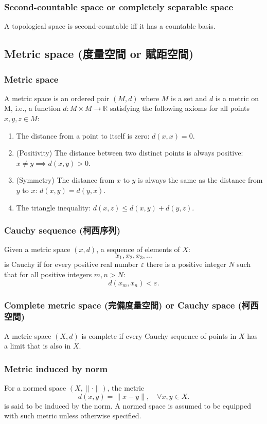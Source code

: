 \documentclass[a4paper,12pt]{article}
\begin{document}
\subsubsection{Second-countable space or completely separable space}
A topological space is second-countable iff it has a countable basis.
\subsection{Metric space (度量空間 or 賦距空間)}
\subsubsection{Metric space}
A metric space is an ordered pair $(M, d)$ where $M$ is a set and $d$ is a metric on M, i.e., a function $d\colon M\times M\to\mathbb{R}$ satisfying the following axioms for all points $x,y,z\in M$:
\begin{enumerate}
\item The distance from a point to itself is zero: $d(x,x)=0$.
\item (Positivity) The distance between two distinct points is always positive:$x\neq y\implies d(x,y)>0$.
\item (Symmetry) The distance from $x$ to $y$ is always the same as the distance from $y$ to $x$: $d(x,y)=d(y,x)$.
\item The triangle inequality: $d(x,z)\leq d(x,y)+d(y,z)$.
\end{enumerate}
\subsubsection{Cauchy sequence (柯西序列)}
Given a metric space $(x,d)$, a sequence of elements of $X$:
\[x_1,x_2,x_3,\ldots\]
is Cauchy if for every positive real number $\varepsilon$ there is a positive integer $N$ such that for all positive integers $m,n>N$:
\[d\left(x_m,x_n\right)<\varepsilon.\]
\subsubsection{Complete metric space (完備度量空間) or Cauchy space (柯西空間)}
A metric space $(X,d)$ is complete if every Cauchy sequence of points in $X$ has a limit that is also in $X$.
\subsubsection{Metric induced by norm}
For a normed space $(X,\|\cdot\|)$, the metric
\[d(x,y)=\|x-y\|,\quad \forall x,y\in X.\]
is said to be induced by the norm. A normed space is assumed to be equipped with such metric unless otherwise specified.
\end{document}

